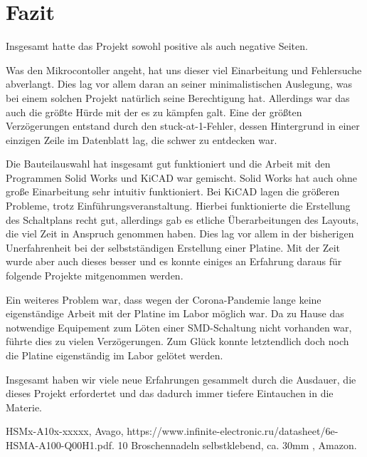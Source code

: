 \documentclass[a4paper,
DIV=13,
12pt,
BCOR=10mm,
department=FakEI,
parskip=half,
automark,
]{article}
\begin{document}
\section{Fazit}

Insgesamt hatte das Projekt sowohl positive als auch negative Seiten.

Was den Mikrocontoller angeht, hat uns dieser viel Einarbeitung und Fehlersuche abverlangt. Dies lag vor allem daran an seiner minimalistischen Auslegung, was bei einem solchen Projekt natürlich seine Berechtigung hat. Allerdings war das auch die größte Hürde mit der es zu kämpfen galt. Eine der größten Verzögerungen entstand durch den stuck-at-1-Fehler, dessen Hintergrund in einer einzigen Zeile im Datenblatt lag, die schwer zu entdecken war.

Die Bauteilauswahl hat insgesamt gut funktioniert und die Arbeit mit den Programmen Solid Works und KiCAD war gemischt. Solid Works hat auch ohne große Einarbeitung sehr intuitiv funktioniert. Bei KiCAD lagen die größeren Probleme, trotz Einführungsveranstaltung. Hierbei funktionierte die Erstellung des Schaltplans recht gut, allerdings gab es etliche Überarbeitungen des Layouts, die viel Zeit in Anspruch genommen haben. Dies lag vor allem in der bisherigen Unerfahrenheit bei der selbstständigen Erstellung einer Platine. Mit der Zeit wurde aber auch dieses besser und es konnte einiges an Erfahrung daraus für folgende Projekte mitgenommen werden. 

Ein weiteres Problem war, dass wegen der Corona-Pandemie lange keine eigenständige Arbeit mit der Platine im Labor möglich war. Da zu Hause das notwendige Equipement zum Löten einer SMD-Schaltung nicht vorhanden war, führte dies zu vielen Verzögerungen. Zum Glück konnte letztendlich doch noch die Platine eigenständig im Labor gelötet werden.

Insgesamt haben wir viele neue Erfahrungen gesammelt durch die Ausdauer, die dieses Projekt erfordertet und das dadurch immer tiefere Eintauchen in die Materie. 






\cleardoublepage
\begin{appendix}
\listoffigures
\listoftables

\cleardoublepage
\begin{thebibliography}{99}
 HSMx-A10x-xxxxx, Avago, https://www.infinite-electronic.ru/datasheet/6e-HSMA-A100-Q00H1.pdf.
 10 Broschennadeln selbstklebend, ca. 30mm , Amazon.
\end{thebibliography}

\cleardoublepage

\end{appendix}
\end{document}
